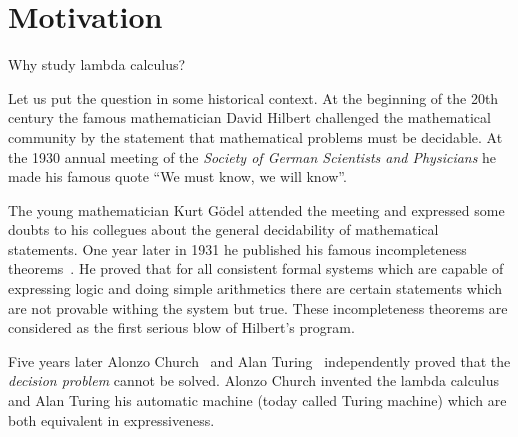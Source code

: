 \section{Motivation}

Why study lambda calculus?

Let us put the question in some historical context. At the beginning of the
20th century the famous mathematician David Hilbert challenged the
mathematical community by the statement that mathematical problems must be
decidable. At the 1930 annual meeting of the \emph{Society of German
  Scientists and Physicians} he made his famous quote ``We must know, we will
know''.

\noindent
{}


The young mathematician Kurt Gödel attended the meeting and expressed some
doubts to his collegues about the general decidability of mathematical
statements. One year later in 1931 he published his famous incompleteness
theorems~\cite{goedel1931}. He proved that for all consistent formal systems
which are capable of expressing logic and doing simple arithmetics there are
certain statements which are not provable withing the system but true. These
incompleteness theorems are considered as the first serious blow of Hilbert's
program.

Five years later Alonzo Church~\cite{church1936} and Alan
Turing~\cite{turing1936} independently proved that the \emph{decision problem}
cannot be solved. Alonzo Church invented the lambda calculus and Alan Turing
his automatic machine (today called Turing machine) which are both equivalent
in expressiveness.


